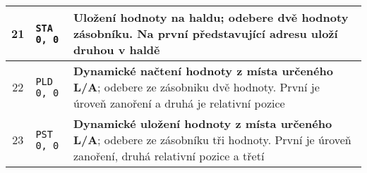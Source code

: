\documentclass[
12pt,
a4paper,
pdftex,
czech
]{report}
\begin{document}
\begin{table}[]
\begin{longtable}{|c|l|p{10cm}|}
\rule{0pt}{3ex} 21 & \texttt{STA 0, 0} & \textbf{Uložení hodnoty na haldu}; odebere dvě hodnoty zásobníku. Na první představující adresu uloží druhou v haldě \\ \hline
\rule{0pt}{3ex} 22 & \texttt{PLD 0, 0} & \textbf{Dynamické načtení hodnoty z místa určeného L/A}; odebere ze zásobniku dvě hodnoty. První je úroveň zanoření a druhá je relativní pozice \\ \hline
\rule{0pt}{3ex} 23 & \texttt{PST 0, 0} & \textbf{Dynamické uložení hodnoty z místa určeného L/A}; odebere ze zásobníku tři hodnoty. První je úroveň zanoření, druhá relativní pozice a třetí \\ \hline
\end{longtable}
\end{table}
\end{document}
